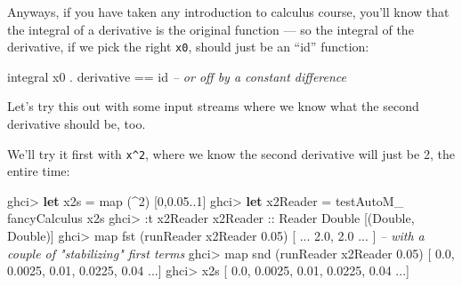 \documentclass[]{article}
\newenvironment{Shaded}{}{}
\newcommand{\KeywordTok}[1]{\textcolor[rgb]{0.00,0.44,0.13}{\textbf{{#1}}}}
\newcommand{\DataTypeTok}[1]{\textcolor[rgb]{0.56,0.13,0.00}{{#1}}}
\newcommand{\DecValTok}[1]{\textcolor[rgb]{0.25,0.63,0.44}{{#1}}}
\newcommand{\FloatTok}[1]{\textcolor[rgb]{0.25,0.63,0.44}{{#1}}}
\newcommand{\CommentTok}[1]{\textcolor[rgb]{0.38,0.63,0.69}{\textit{{#1}}}}
\newcommand{\OtherTok}[1]{\textcolor[rgb]{0.00,0.44,0.13}{{#1}}}
\newcommand{\FunctionTok}[1]{\textcolor[rgb]{0.02,0.16,0.49}{{#1}}}
\newcommand{\NormalTok}[1]{{#1}}
\begin{document}
Anyways, if you have taken any introduction to calculus course, you'll
know that the integral of a derivative is the original function --- so
the integral of the derivative, if we pick the right \texttt{x0}, should
just be an ``id'' function:

\begin{Shaded}
\begin{Highlighting}[]
\NormalTok{integral x0 }\FunctionTok{.} \NormalTok{derivative }\FunctionTok{==} \NormalTok{id      }\CommentTok{-- or off by a constant difference}
\end{Highlighting}
\end{Shaded}

Let's try this out with some input streams where we know what the second
derivative should be, too.

We'll try it first with \texttt{x\^{}2}, where we know the second
derivative will just be 2, the entire time:

\begin{Shaded}
\begin{Highlighting}[]
\NormalTok{ghci}\FunctionTok{>} \KeywordTok{let} \NormalTok{x2s }\FunctionTok{=} \NormalTok{map (}\FunctionTok{^}\DecValTok{2}\NormalTok{) [}\DecValTok{0}\NormalTok{,}\FloatTok{0.05}\FunctionTok{..}\DecValTok{1}\NormalTok{]}
\NormalTok{ghci}\FunctionTok{>} \KeywordTok{let} \NormalTok{x2Reader }\FunctionTok{=} \NormalTok{testAutoM_ fancyCalculus x2s}
\NormalTok{ghci}\FunctionTok{>} \FunctionTok{:}\NormalTok{t x2Reader}
\OtherTok{x2Reader ::} \DataTypeTok{Reader} \DataTypeTok{Double} \NormalTok{[(}\DataTypeTok{Double}\NormalTok{, }\DataTypeTok{Double}\NormalTok{)]}
\NormalTok{ghci}\FunctionTok{>} \NormalTok{map fst (runReader x2Reader }\FloatTok{0.05}\NormalTok{)}
\NormalTok{[ }\FunctionTok{...} \FloatTok{2.0}\NormalTok{, }\FloatTok{2.0} \FunctionTok{...} \NormalTok{]    }\CommentTok{-- with a couple of "stabilizing" first terms}
\NormalTok{ghci}\FunctionTok{>} \NormalTok{map snd (runReader x2Reader }\FloatTok{0.05}\NormalTok{)}
\NormalTok{[ }\FloatTok{0.0}\NormalTok{, }\FloatTok{0.0025}\NormalTok{, }\FloatTok{0.01}\NormalTok{, }\FloatTok{0.0225}\NormalTok{, }\FloatTok{0.04} \FunctionTok{...}\NormalTok{]}
\NormalTok{ghci}\FunctionTok{>} \NormalTok{x2s}
\NormalTok{[ }\FloatTok{0.0}\NormalTok{, }\FloatTok{0.0025}\NormalTok{, }\FloatTok{0.01}\NormalTok{, }\FloatTok{0.0225}\NormalTok{, }\FloatTok{0.04} \FunctionTok{...}\NormalTok{]}
\end{Highlighting}
\end{Shaded}
\end{document}
